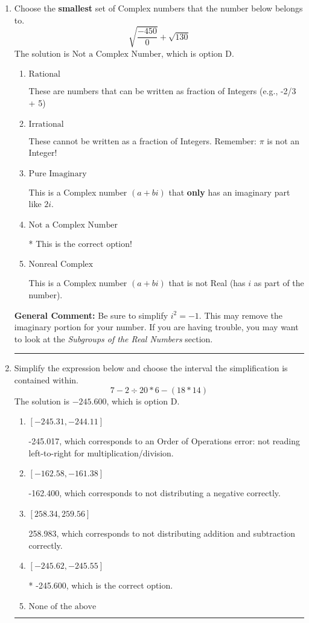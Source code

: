 \documentclass{extbook}[14pt]
\newcommand{\litem}[1]{\item #1

\rule{\textwidth}{0.4pt}}
\begin{document}
\begin{enumerate}\litem{
Choose the \textbf{smallest} set of Complex numbers that the number below belongs to.
\[ \sqrt{\frac{-450}{0}}+\sqrt{130} \]The solution is \( \text{Not a Complex Number} \), which is option D.\begin{enumerate}[label=\Alph*.]
\item \( \text{Rational} \)

These are numbers that can be written as fraction of Integers (e.g., -2/3 + 5)
\item \( \text{Irrational} \)

These cannot be written as a fraction of Integers. Remember: $\pi$ is not an Integer!
\item \( \text{Pure Imaginary} \)

This is a Complex number $(a+bi)$ that \textbf{only} has an imaginary part like $2i$.
\item \( \text{Not a Complex Number} \)

* This is the correct option!
\item \( \text{Nonreal Complex} \)

This is a Complex number $(a+bi)$ that is not Real (has $i$ as part of the number).
\end{enumerate}

\textbf{General Comment:} Be sure to simplify $i^2 = -1$. This may remove the imaginary portion for your number. If you are having trouble, you may want to look at the \textit{Subgroups of the Real Numbers} section.
}
\litem{
Simplify the expression below and choose the interval the simplification is contained within.
\[ 7 - 2 \div 20 * 6 - (18 * 14) \]The solution is \( -245.600 \), which is option D.\begin{enumerate}[label=\Alph*.]
\item \( [-245.31, -244.11] \)

 -245.017, which corresponds to an Order of Operations error: not reading left-to-right for multiplication/division.
\item \( [-162.58, -161.38] \)

 -162.400, which corresponds to not distributing a negative correctly.
\item \( [258.34, 259.56] \)

 258.983, which corresponds to not distributing addition and subtraction correctly.
\item \( [-245.62, -245.55] \)

* -245.600, which is the correct option.
\item \( \text{None of the above} \)


\end{enumerate}}
\end{enumerate}
\end{document}
